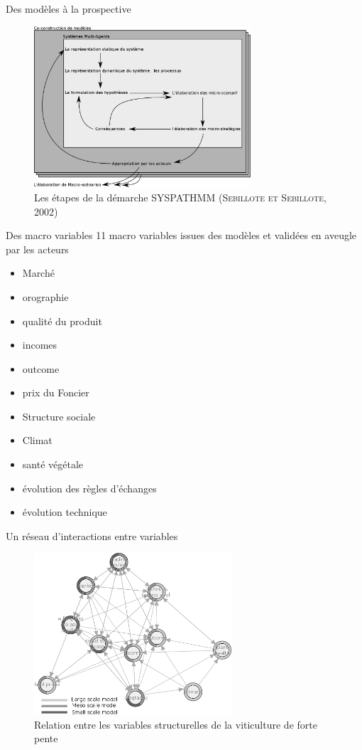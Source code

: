 \documentclass[newPxFont]{beamer}
\begin{document}
\begin{frame}[c]{Des modèles à la prospective}
  \vspace{-2em}
  \begin{figure}
   \includegraphics[height=6cm]{img/a_etapes_syspathmm.png}
   \caption{Les étapes de la démarche SYSPATHMM (\textsc{Sebillote et Sebillote,  2002})}
  \end{figure}
\end{frame}

\begin{frame}[c]{Des macro variables}
  \vspace{-2em}
  11 macro variables issues des modèles et validées en aveugle par les acteurs
  \begin{itemize}
    \item Marché
    \item orographie
    \item qualité du produit
    \item incomes
    \item outcome
    \item prix du Foncier
    \item Structure sociale
    \item Climat
    \item santé végétale
    \item évolution des règles d'échanges
    \item évolution technique
  \end{itemize}
\end{frame}

\begin{frame}[c]{Un réseau d'interactions entre variables}
  \vspace{-2em}
  \begin{figure}
   \includegraphics[height=6cm]{img/a_igraph_variables_structurelle.png}
   \caption{Relation entre les variables structurelles de la viticulture de forte pente}
  \end{figure}
\end{frame}
\end{document}
